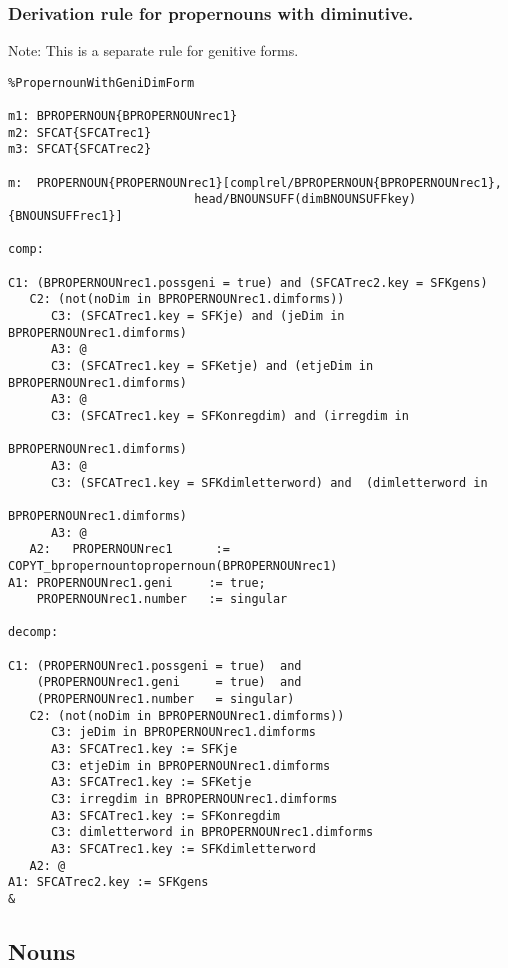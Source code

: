 \subsubsection{Derivation rule for propernouns with diminutive.}
Note: This is a separate rule for genitive forms.
\begin{verbatim}
%PropernounWithGeniDimForm

m1: BPROPERNOUN{BPROPERNOUNrec1}
m2: SFCAT{SFCATrec1}
m3: SFCAT{SFCATrec2}

m:  PROPERNOUN{PROPERNOUNrec1}[complrel/BPROPERNOUN{BPROPERNOUNrec1}, 
                          head/BNOUNSUFF(dimBNOUNSUFFkey){BNOUNSUFFrec1}]

comp:

C1: (BPROPERNOUNrec1.possgeni = true) and (SFCATrec2.key = SFKgens)
   C2: (not(noDim in BPROPERNOUNrec1.dimforms))
      C3: (SFCATrec1.key = SFKje) and (jeDim in BPROPERNOUNrec1.dimforms)
      A3: @
      C3: (SFCATrec1.key = SFKetje) and (etjeDim in BPROPERNOUNrec1.dimforms)  
      A3: @
      C3: (SFCATrec1.key = SFKonregdim) and (irregdim in 
                                                    BPROPERNOUNrec1.dimforms)
      A3: @
      C3: (SFCATrec1.key = SFKdimletterword) and  (dimletterword in
                                                    BPROPERNOUNrec1.dimforms)
      A3: @
   A2:   PROPERNOUNrec1      := COPYT_bpropernountopropernoun(BPROPERNOUNrec1)
A1: PROPERNOUNrec1.geni     := true;
    PROPERNOUNrec1.number   := singular

decomp:

C1: (PROPERNOUNrec1.possgeni = true)  and
    (PROPERNOUNrec1.geni     = true)  and
    (PROPERNOUNrec1.number   = singular) 
   C2: (not(noDim in BPROPERNOUNrec1.dimforms))
      C3: jeDim in BPROPERNOUNrec1.dimforms
      A3: SFCATrec1.key := SFKje
      C3: etjeDim in BPROPERNOUNrec1.dimforms
      A3: SFCATrec1.key := SFKetje
      C3: irregdim in BPROPERNOUNrec1.dimforms
      A3: SFCATrec1.key := SFKonregdim
      C3: dimletterword in BPROPERNOUNrec1.dimforms
      A3: SFCATrec1.key := SFKdimletterword
   A2: @
A1: SFCATrec2.key := SFKgens
&
\end{verbatim}
\newpage
\subsection{Nouns}
